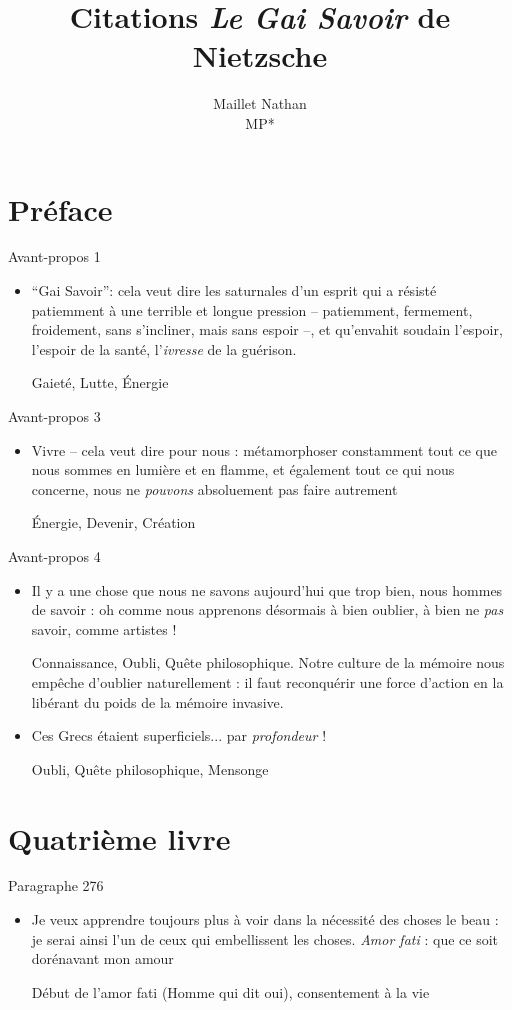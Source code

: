 \documentclass[french,a4paper,11pt,answers]{exam}
\title{Citations \emph{Le Gai Savoir} de Nietzsche}
\author{Maillet Nathan\\MP*}
\date{}
\newcommand{\cit}[2]{\og #1 \fg{} \begin{solution}{ #2 }\end{solution}} %
\begin{document}
	\maketitle
	\section{Préface}
	\begin{cadre}{Avant-propos 1}
		\begin{itemize}
			\item \cit{“Gai Savoir'': cela veut dire les saturnales d'un esprit qui a résisté patiemment à une terrible et longue pression -- patiemment, fermement, froidement, sans s'incliner, mais sans espoir --, et qu'envahit soudain l'espoir, l'espoir de la santé, l'\emph{ivresse} de la guérison.}
				{Gaieté, Lutte, Énergie}
		\end{itemize}
	\end{cadre}
	
	\begin{cadre}{Avant-propos 3}
		\begin{itemize}
			\item \cit{Vivre -- cela veut dire pour nous : métamorphoser constamment tout ce que nous sommes en lumière et en flamme, et également tout ce qui nous concerne, nous ne \emph{pouvons} absoluement pas faire autrement}
				{Énergie, Devenir, Création}
		\end{itemize}
	\end{cadre}

	\begin{cadre}{Avant-propos 4}
		\begin{itemize}
			\item \cit{Il y a une chose que nous ne savons aujourd'hui que trop bien, nous hommes de savoir : oh comme nous apprenons désormais à bien oublier, à bien ne \emph{pas} savoir, comme artistes !}
				{Connaissance, Oubli, Quête philosophique. Notre culture de la mémoire nous empêche d'oublier naturellement : il faut reconquérir une force d'action en la libérant du poids de la mémoire invasive.}
			\item \cit{Ces Grecs étaient superficiels... par \emph{profondeur} !}
				{Oubli, Quête philosophique, Mensonge}
		\end{itemize}
	\end{cadre}

	\section{Quatrième livre}
	\begin{cadre}{Paragraphe 276}
		\begin{itemize}
			\item \cit{Je veux apprendre toujours plus à voir dans la nécessité des choses le beau : je serai ainsi l'un de ceux qui embellissent les choses. \emph{Amor fati} : que ce soit dorénavant mon amour}
				{Début de l'amor fati (Homme qui dit oui), consentement à la vie}
		\end{itemize}
	\end{cadre}
	
\end{document}
